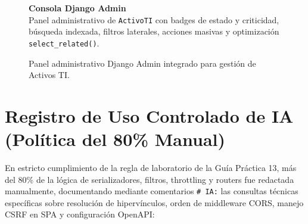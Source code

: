 \documentclass[10pt,a4paper]{article}
\begin{document}
\begin{figure}[H]
\centering
\begin{minipage}[c]{0.73\textwidth}
    \centering
\end{minipage}\hfill
\begin{minipage}[c]{0.24\textwidth}
    \raggedright
    \textbf{\color{uncpnavy}\small Consola Django Admin}\\[4pt]
    \footnotesize
    \color{uncpdark}
    Panel administrativo de \texttt{ActivoTI} con badges de estado y criticidad, búsqueda indexada, filtros laterales, acciones masivas y optimización \texttt{select\_related()}.
\end{minipage}
\vspace{-0.2cm}
\caption{Panel administrativo Django Admin integrado para gestión de Activos TI.}
\label{fig:interfaz_admin}
\end{figure}

\newpage

\section{Registro de Uso Controlado de IA (Política del 80\% Manual)}
En estricto cumplimiento de la regla de laboratorio de la Guía Práctica 13, más del 80\% de la lógica de serializadores, filtros, throttling y routers fue redactada manualmente, documentando mediante comentarios \texttt{\# IA:} las consultas técnicas específicas sobre resolución de hipervínculos, orden de middleware CORS, manejo CSRF en SPA y configuración OpenAPI:
\end{document}
